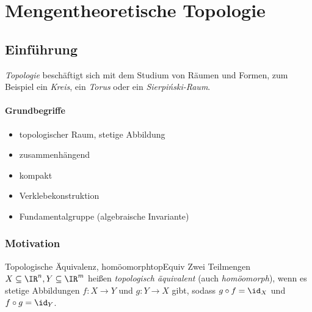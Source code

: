 \documentclass[language=ngerman]{TemplateLecture} %
\begin{document}

\part{Mengentheoretische Topologie}
\chapter{Einführung}


\emph{Topologie} beschäftigt sich mit dem Studium von Räumen und Formen, zum Beispiel ein \emph{Kreis}, ein \emph{Torus} oder ein \emph{Sierpi\'nski-Raum}.

\subsection*{Grundbegriffe}
\begin{itemize}
    \item topologischer Raum, stetige Abbildung
    \item zusammenhängend
    \item kompakt
    \item Verklebekonstruktion
    \item Fundamentalgruppe (algebraische Invariante)
\end{itemize}

\section*{Motivation}
\begin{defi}{Topologische Äquivalenz, homöomorph}{topEquiv}
    Zwei Teilmengen $X \subseteq \IR^n, Y \subseteq \IR^m$ heißen \emph{topologisch äquivalent} (auch \emph{homöomorph}), wenn es stetige Abbildungen $f: X \to Y$ und $g: Y \to X$ gibt, sodass $g \circ f = \id_X$ und $f \circ g = \id_Y$.
\end{defi}
\end{document}
